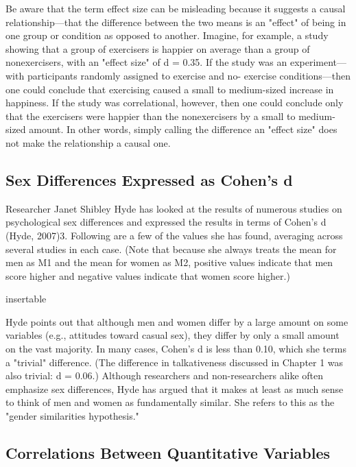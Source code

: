Be aware that the term effect size can be misleading because it suggests a causal relationship---that the difference between the two means is an "effect" of being in one group or condition as opposed to another. Imagine, for example, a study showing that a group of exercisers is happier on average than a group of nonexercisers, with an "effect size" of d = 0.35. If the study was an experiment---with participants randomly assigned to exercise and no- exercise conditions---then one could conclude that exercising caused a small to medium-sized increase in happiness. If the study was correlational, however, then one could conclude only that the exercisers were happier than the nonexercisers by a small to medium-sized amount. In other words, simply calling the difference an "effect size" does not make the relationship a causal one.



\subsection{Sex Differences Expressed as Cohen's d}

Researcher Janet Shibley Hyde has looked at the results of numerous studies on psychological sex differences and expressed the results in terms of Cohen's d (Hyde, 2007)3. Following are a few of the values she has found, averaging across several studies in each case. (Note that because she always treats the mean for men as M1 and the mean for women as M2, positive values indicate that men score higher and negative values indicate that women score higher.)
 

insertable

Hyde points out that although men and women differ by a large amount on some variables (e.g., attitudes toward casual sex), they differ by only a small amount on the vast majority. In many cases, Cohen's d is less
than 0.10, which she terms a "trivial" difference. (The difference in talkativeness discussed in Chapter 1 was also trivial: d = 0.06.) Although researchers and non-researchers alike often emphasize sex differences, Hyde has argued that it makes at least as much sense to think of men and women as fundamentally similar. She refers to this as the "gender similarities hypothesis."



\subsection{Correlations Between Quantitative Variables}

